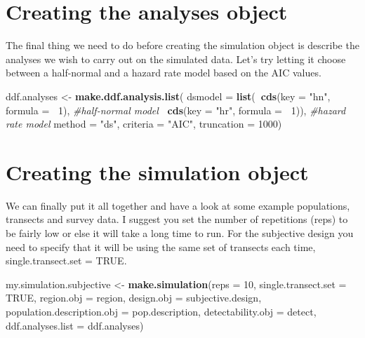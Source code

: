 \documentclass[]{book}
\newenvironment{Shaded}{\begin{snugshade}}{\end{snugshade}}
\newcommand{\KeywordTok}[1]{\textcolor[rgb]{0.13,0.29,0.53}{\textbf{#1}}}
\newcommand{\DataTypeTok}[1]{\textcolor[rgb]{0.13,0.29,0.53}{#1}}
\newcommand{\DecValTok}[1]{\textcolor[rgb]{0.00,0.00,0.81}{#1}}
\newcommand{\StringTok}[1]{\textcolor[rgb]{0.31,0.60,0.02}{#1}}
\newcommand{\CommentTok}[1]{\textcolor[rgb]{0.56,0.35,0.01}{\textit{#1}}}
\newcommand{\OtherTok}[1]{\textcolor[rgb]{0.56,0.35,0.01}{#1}}
\newcommand{\OperatorTok}[1]{\textcolor[rgb]{0.81,0.36,0.00}{\textbf{#1}}}
\newcommand{\NormalTok}[1]{#1}
\theoremstyle{definition}
\theoremstyle{definition}
\theoremstyle{remark}
\begin{document}
\section{Creating the analyses
object}\label{creating-the-analyses-object}

The final thing we need to do before creating the simulation object is
describe the analyses we wish to carry out on the simulated data. Let's
try letting it choose between a half-normal and a hazard rate model
based on the AIC values.

\begin{Shaded}
\begin{Highlighting}[]
\NormalTok{ddf.analyses <-}\StringTok{ }\KeywordTok{make.ddf.analysis.list}\NormalTok{(}
                \DataTypeTok{dsmodel =} \KeywordTok{list}\NormalTok{(}\OperatorTok{~}\KeywordTok{cds}\NormalTok{(}\DataTypeTok{key =} \StringTok{"hn"}\NormalTok{, }\DataTypeTok{formula =} \OperatorTok{~}\DecValTok{1}\NormalTok{), }\CommentTok{#half-normal model}
                               \OperatorTok{~}\KeywordTok{cds}\NormalTok{(}\DataTypeTok{key =} \StringTok{"hr"}\NormalTok{, }\DataTypeTok{formula =} \OperatorTok{~}\DecValTok{1}\NormalTok{)),  }\CommentTok{#hazard rate model}
                \DataTypeTok{method =} \StringTok{"ds"}\NormalTok{, }\DataTypeTok{criteria =} \StringTok{"AIC"}\NormalTok{, }\DataTypeTok{truncation =} \DecValTok{1000}\NormalTok{)}
\end{Highlighting}
\end{Shaded}

\section{Creating the simulation
object}\label{creating-the-simulation-object}

We can finally put it all together and have a look at some example
populations, transects and survey data. I suggest you set the number of
repetitions (reps) to be fairly low or else it will take a long time to
run. For the subjective design you need to specify that it will be using
the same set of transects each time, single.transect.set = TRUE.

\begin{Shaded}
\begin{Highlighting}[]
\NormalTok{my.simulation.subjective <-}\StringTok{ }\KeywordTok{make.simulation}\NormalTok{(}\DataTypeTok{reps =} \DecValTok{10}\NormalTok{, }
                                            \DataTypeTok{single.transect.set =} \OtherTok{TRUE}\NormalTok{, }
                                            \DataTypeTok{region.obj =}\NormalTok{ region, }
                                            \DataTypeTok{design.obj =}\NormalTok{ subjective.design, }
                                            \DataTypeTok{population.description.obj =}\NormalTok{ pop.description,}
                                            \DataTypeTok{detectability.obj =}\NormalTok{ detect, }
                                            \DataTypeTok{ddf.analyses.list =}\NormalTok{ ddf.analyses)}
\end{Highlighting}
\end{Shaded}
\end{document}
